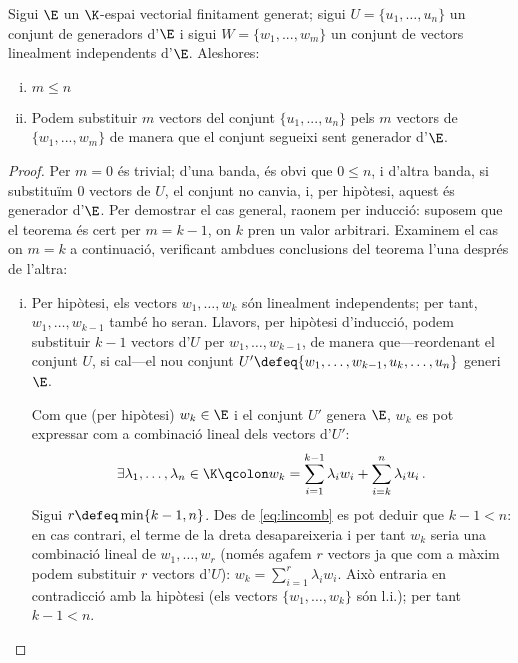 \begin{specialteo}\label{teo:steinitz}
	Sigui $\E$ un $\K$-espai vectorial finitament generat; sigui $U = \{u_1,\dots, u_n\}$ un conjunt de generadors d'$\E$ i sigui $W = \{w_1,..., w_m\}$ un conjunt de vectors linealment independents d'$\E$. Aleshores:
	\begin{enumerate}[i)]
		\item $m \leq n$
		\item Podem substituir $m$ vectors del conjunt $\{u_1, ..., u_n\}$ pels $m$ vectors de $\{w_1,..., w_m\}$ de manera que el conjunt segueixi sent generador d'$\E$.
	\end{enumerate}	
	\begin{proof} 
		Per $m=0$ és trivial; d'una banda, és obvi que $0\le n$, i d'altra banda, si substituïm 0 vectors de $U$, el conjunt no canvia, i, per  hipòtesi, aquest és generador d'$\E$. Per demostrar el cas general, raonem per inducció: suposem que el teorema és cert per $m = k-1$, on $k$ pren un valor arbitrari. Examinem el cas on $m = k$ a continuació, verificant ambdues conclusions del teorema l'una després de l'altra:
		
		\begin{enumerate}[i)]
			\item Per hipòtesi, els vectors $w_1, \ldots, w_k$ són linealment independents; per tant, %
			$w_1, \ldots, w_{k-1}$ també ho seran. Llavors, per hipòtesi d'inducció, podem substituir $k-1$ vectors d'$U$ per $w_1, \ldots, w_{k-1}$, de manera que---reordenant el conjunt $U$, si cal---el nou conjunt ${U'\defeq \{w_1, \ldots, w_{k-1}, u_k, \ldots, u_n\}}$ generi $\E$.
			
			Com que (per hipòtesi) $w_k\in\E$ i el conjunt $U'$ genera $\E$, $w_k$ es pot expressar com a combinació lineal dels vectors d'$U'$: 
			\begin{equation}\label{eq:lincomb}
				\exists \lambda_1,\ldots, \lambda_n \in \K \qcolon w_k = \sum_{i=1}^{k-1} \lambda_i w_i + \sum_{i = k}^{n} \lambda_i u_i\,.
			\end{equation}
			Sigui $r \defeq \min \{k-1, n\}$. Des de \eqref{eq:lincomb} es pot deduir que $k-1 < n$: en cas contrari, el terme de la dreta desapareixeria i per tant $w_k$ seria una combinació lineal de $w_1, \ldots, w_r$ (només agafem $r$ vectors ja que com a màxim podem substituir $r$ vectors d'$U$): $w_k = \sum_{i=1}^{r} \lambda_iw_i$. Això entraria en contradicció amb la hipòtesi (els vectors $\{w_1, \ldots, w_k\}$ són l.i.); per tant $k-1 < n$.
			

\end{enumerate}
\end{proof}
\end{specialteo}
